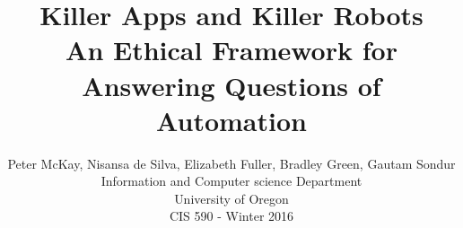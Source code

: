 \documentclass[12pt,twocolumn]{IEEEtran11}
\begin{document}


\title{%
  Killer Apps and Killer Robots \\
\Large An Ethical Framework for Answering Questions of Automation
}
\author{
Peter McKay, Nisansa de Silva, Elizabeth Fuller, Bradley Green, 
Gautam Sondur\\
Information and Computer science Department\\
University of Oregon\\
CIS 590 - Winter 2016\\
}
\maketitle










\end{document}
